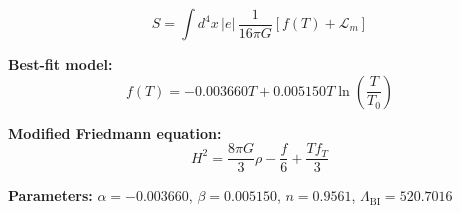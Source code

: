 
\begin{equation}
  S = \int d^4x \, |e| \, \frac{1}{16\pi G} \left[ f(T) + \mathcal{L}_m \right]
\end{equation}

\textbf{Best-fit model:}
\begin{equation}
  f(T) = -0.003660 T + 0.005150 T \ln\!\left(\frac{T}{T_0}\right)
\end{equation}

\textbf{Modified Friedmann equation:}
\begin{equation}
  H^2 = \frac{8\pi G}{3} \rho - \frac{f}{6} + \frac{T f_T}{3}
\end{equation}

\textbf{Parameters:}
$\alpha = -0.003660$, \quad
$\beta = 0.005150$, \quad
$n = 0.9561$, \quad
$\Lambda_{\text{BI}} = 520.7016$